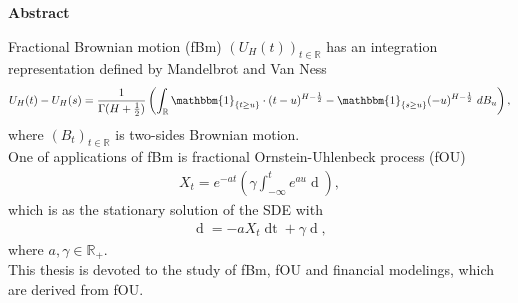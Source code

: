 \documentclass[a4paper, twoside, 11pt]{article}
\theoremstyle{definition}
\newcommand{\brkt}[1]{\left({#1} \right)}
\renewenvironment{abstract}{
	\begin{center}
		  \Large
		  \textbf{Abstract}
		  \hspace{2em}
	\end{center}				
  }{}
\begin{document}
  
  \newpage

  \thispagestyle{empty}
  \begin{abstract}
  Fractional Brownian motion (fBm) $(U_H(t))_{t\in \mathbb{R}}$ has an integration representation defined by Mandelbrot and Van Ness\cite{mandelbrot}
\begin{eqnarray*}
 	U_H(t) - U_H(s) = \frac{1}{\Gamma(H+\frac{1}{2})}\brkt{\int_{\mathbb{R}} \mathbbm{1}_{\{t\ge u\}}\cdot (t-u)^{H-\frac{1}{2}} - \mathbbm{1}_{\{s\ge u\}} (-u)^{H-\frac{1}{2}} \, \mathop{dB_u}},
\end{eqnarray*}
where $(B_t)_{t\in\mathbb{R}}$ is two-sides Brownian motion.\\
One of applications of fBm is fractional Ornstein-Uhlenbeck process (fOU) 
\begin{eqnarray*}
  X_t = e^{-at}\brkt{\gamma\int_{-\infty}^t e^{au}\mathop{dU_H(u)}},
\end{eqnarray*}
which is as the stationary solution of the SDE with 
\begin{eqnarray*}
  \mathop{dX_t} = -aX_t\mathop{dt} + \gamma\mathop{dU_H(t)},
\end{eqnarray*}
where $a,\gamma \in \mathbb{R}_+$.\\
This thesis is devoted to the study of fBm, fOU and financial modelings, which are derived from fOU.

  \end{abstract}
\newpage

\thispagestyle{empty}
\mbox{}
\newpage
\fancyhead[LO, RE]{}
\fancyfoot[LE, RO]{}
\tableofcontents
\newpage
\thispagestyle{empty}
\mbox{}
\newpage

\fancyhead[RO]{\leftmark}
\fancyhead[LE]{\rightmark}
\fancyfoot[LE, RO]{\large \thepage}
\setcounter{section}{0}
\setcounter{page}{1}
\end{document}
